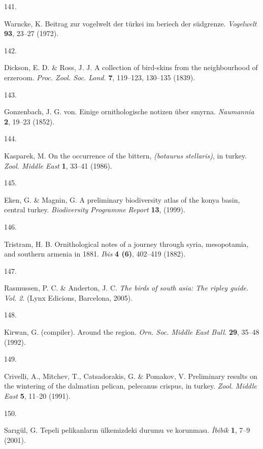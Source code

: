 \documentclass[
  letterpaper,
  DIV=11,
  numbers=noendperiod]{scrreprt}
\newlength{\cslhangindent}
\newlength{\csllabelwidth}
\newenvironment{CSLReferences}[2] %
 {\begin{list}{}{%
  \setlength{\itemindent}{0pt}
  \setlength{\leftmargin}{0pt}
  \setlength{\parsep}{0pt}
  \ifodd #1
   \setlength{\leftmargin}{\cslhangindent}
   \setlength{\itemindent}{-1\cslhangindent}
  \fi
  \setlength{\itemsep}{#2\baselineskip}}}
 {\end{list}}
\newcommand{\CSLLeftMargin}[1]{\parbox[t]{\csllabelwidth}{\strut#1\strut}}
\newcommand{\CSLRightInline}[1]{\parbox[t]{\linewidth - \csllabelwidth}{\strut#1\strut}}
\begin{document}
\begin{CSLReferences}{0}{0}
\CSLLeftMargin{141. }%
\CSLRightInline{Warncke, K. Beitrag zur vogelwelt der türkei im beriech
der südgrenze. \emph{Vogelwelt} \textbf{93}, 23--27 (1972).}

\CSLLeftMargin{142. }%
\CSLRightInline{Dickson, E. D. \& Ross, J. J. A collection of bird-skins
from the neighbourhood of erzeroom. \emph{Proc. Zool. Soc. Lond.}
\textbf{7}, 119--123, 130--135 (1839).}

\CSLLeftMargin{143. }%
\CSLRightInline{Gonzenbach, J. G. von. Einige ornithologische notizen
über smyrna. \emph{Naumannia} \textbf{2}, 19--23 (1852).}

\CSLLeftMargin{144. }%
\CSLRightInline{Kasparek, M. On the occurrence of the bittern,
\emph{(botaurus stellaris)}, in turkey. \emph{Zool. Middle East}
\textbf{1}, 33--41 (1986).}

\CSLLeftMargin{145. }%
\CSLRightInline{Eken, G. \& Magnin, G. A preliminary biodiversity atlas
of the konya basin, central turkey. \emph{Biodiversity Programme Report}
\textbf{13}, (1999).}

\CSLLeftMargin{146. }%
\CSLRightInline{Tristram, H. B. Ornithological notes of a journey
through syria, mesopotamia, and southern armenia in 1881. \emph{Ibis}
\textbf{4 (6)}, 402--419 (1882).}

\CSLLeftMargin{147. }%
\CSLRightInline{Rasmussen, P. C. \& Anderton, J. C. \emph{The birds of
south asia: The ripley guide. Vol. 2}. (Lynx Edicions, Barcelona,
2005).}

\CSLLeftMargin{148. }%
\CSLRightInline{Kirwan, G. (compiler). Around the region. \emph{Orn.
Soc. Middle East Bull.} \textbf{29}, 35--48 (1992).}

\CSLLeftMargin{149. }%
\CSLRightInline{Crivelli, A., Mitchev, T., Catsadorakis, G. \& Pomakov,
V. Preliminary results on the wintering of the dalmatian pelican,
pelecanus crispus, in turkey. \emph{Zool. Middle East} \textbf{5},
11--20 (1991).}

\CSLLeftMargin{150. }%
\CSLRightInline{Sarıgül, G. Tepeli pelikanların ülkemizdeki durumu ve
korunması. \emph{İbibik} \textbf{1}, 7--9 (2001).}


\end{CSLReferences}
\end{document}
